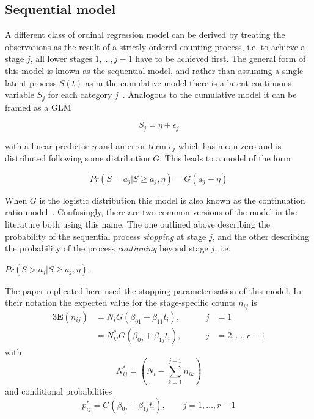 \subsection{Sequential model}
A different class of ordinal regression model can be derived by treating the observations as the result of a strictly ordered counting process, i.e. to achieve a stage $j$, all lower stages $1,\dots,j-1$ have to be achieved first. 
The general form of this model is known as the sequential model, and rather than assuming a single latent process $S(t)$ as in the cumulative model there is a latent continuous variable $S_j$ for each category $j$~\citep{burkner2019ordinal}. 
Analogous to the cumulative model it can be framed as a GLM 

\begin{equation}
S_j = \eta + \epsilon_j
\end{equation}

with a linear predictor $\eta$ and an error term $\epsilon_j$ which has mean zero and is distributed following some distribution $G$. 
This leads to a model of the form 

\begin{equation}
Pr(S = a_j|S \geq a_j, \eta) = G(a_j - \eta)
\end{equation}

When $G$ is the logistic distribution this model is also known as the continuation ratio model~\citep{fienberg1980analysis,burkner2019ordinal}. 
Confusingly, there are two common versions of the model in the literature both using this name. 
The one outlined above describing the probability of the sequential process \emph{stopping} at stage $j$, and the other describing the probability of the process \emph{continuing} beyond stage $j$, i.e. 

$Pr(S > a_j | S \geq a_j, \eta)$ \citep{burkner2019ordinal,VGAM}. 

The paper replicated here \citep{candy1991modeling} used the stopping parameterisation of this model.
In their notation the expected value for the stage-specific counts $n_{ij}$ is
\begin{alignat}{3}
\mathbf{E}(n_{ij})&=N_i G(\beta_{01} + \beta_{11}t_i), &j&=1 \label{eq:candy_sm_counts}\\
&=N^*_{ij} G(\beta_{0j} + \beta_{1j}t_i), \qquad &j&=2,\dots,r-1 \nonumber
\end{alignat}
with 
\begin{equation}
N^*_{ij}=\left(N_i - \sum_{k=1}^{j-1}n_{ik}\right) \label{eq:n_star}
\end{equation}
and conditional probabilities 
\begin{equation}
p^*_{ij} =  G(\beta_{0j} + \beta_{1j}t_i), \qquad j=1,\dots,r-1
\end{equation}

